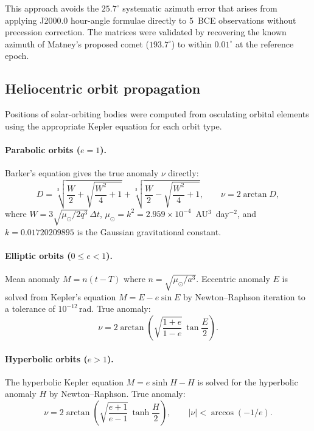 \documentclass[11pt,a4paper]{article}
\begin{document}
This approach avoids the $25.7^\circ$ systematic azimuth error that arises
from applying J2000.0 hour-angle formulae directly to 5~BCE observations
without precession correction. The matrices were validated by recovering the
known azimuth of Matney's proposed comet\cite{matney2025jbaa} ($193.7^\circ$) to within $0.01^\circ$ at
the reference epoch.

\subsection{Heliocentric orbit propagation}\label{subsec:heliprop}

Positions of solar-orbiting bodies were computed from osculating orbital
elements using the appropriate Kepler equation for each orbit type.

\paragraph{Parabolic orbits ($e = 1$).} Barker's equation gives the true
anomaly $\nu$ directly:
\begin{equation}
  D = \sqrt[3]{\frac{W}{2} + \sqrt{\frac{W^2}{4}+1}}
    + \sqrt[3]{\frac{W}{2} - \sqrt{\frac{W^2}{4}+1}}, \qquad
  \nu = 2\arctan D,
\end{equation}
where $W = 3\sqrt{\mu_\odot/2q^3}\,\Delta t$, $\mu_\odot = k^2 =
2.959\times10^{-4}$~AU$^3$~day$^{-2}$, and $k = 0.01720209895$ is the
Gaussian gravitational constant.

\paragraph{Elliptic orbits ($0 \le e < 1$).} Mean anomaly $M = n(t-T)$
where $n = \sqrt{\mu_\odot/a^3}$. Eccentric anomaly $E$ is solved from
Kepler's equation $M = E - e\sin E$ by Newton--Raphson iteration to a
tolerance of $10^{-12}$\,rad. True anomaly:
\begin{equation}
  \nu = 2\arctan\!\left(\sqrt{\frac{1+e}{1-e}}\,\tan\frac{E}{2}\right).
\end{equation}

\paragraph{Hyperbolic orbits ($e > 1$).} The hyperbolic Kepler equation
$M = e\sinh H - H$ is solved for the hyperbolic anomaly $H$ by
Newton--Raphson. True anomaly:
\begin{equation}
  \nu = 2\arctan\!\left(\sqrt{\frac{e+1}{e-1}}\,\tanh\frac{H}{2}\right),
  \qquad |\nu| < \arccos(-1/e).
\end{equation}
\end{document}
